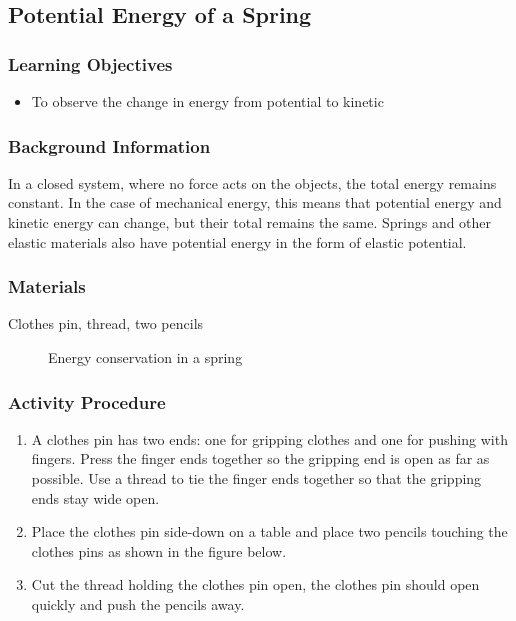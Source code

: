 \subsection{Potential Energy of a Spring}

\subsubsection*{Learning Objectives}
\begin{itemize}
\item{To observe the change in energy from potential to kinetic}
\end{itemize}

\subsubsection*{Background Information}
In a closed system, where no force acts on the objects, the total energy remains constant.  In the case of mechanical energy, this means that potential energy and kinetic energy can change, but their total remains the same.  Springs and other elastic materials also have potential energy in the form of elastic potential.

\subsubsection{Materials} 
Clothes pin, thread, two pencils

\begin{figure}[h]
\begin{center}
\def\svgwidth{100pt}

\caption{Energy conservation in a spring}
\label{fig:energy-conservation}
\end{center}
\end{figure}

\subsubsection{Activity Procedure}
\begin{enumerate}
\item{A clothes pin has two ends: one for gripping clothes and one for pushing with fingers. Press the finger ends together so the gripping end is open as far as possible. Use a thread to tie the finger ends together so that the gripping ends stay wide open.}
\item{Place the clothes pin side-down on a table and place two pencils touching the clothes pins as shown in the figure below.}
\item{Cut the thread holding the clothes pin open, the clothes pin should open quickly and push the pencils away.}
\end{enumerate}


